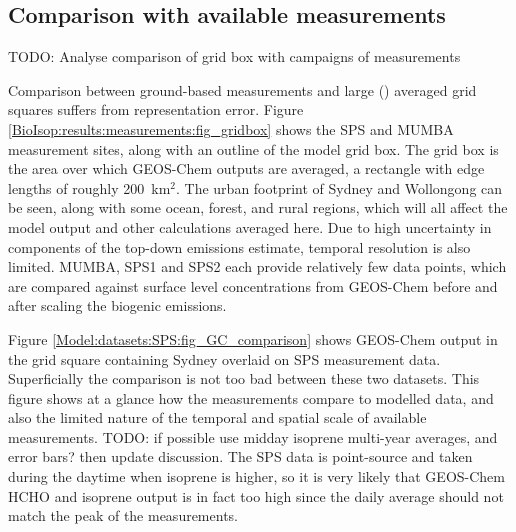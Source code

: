   
  \subsection{Comparison with available measurements}
    \label{BioIsop:results:measurements}
    TODO: %
    Analyse comparison of grid box with campaigns of measurements
    
    Comparison between ground-based measurements and large (\lowhr) averaged grid squares suffers from representation error.
    Figure \ref{BioIsop:results:measurements:fig_gridbox} shows the SPS and MUMBA measurement sites, along with an outline of the \lowhr model grid box.
    The grid box is the area over which GEOS-Chem outputs are averaged, a rectangle with edge lengths of roughly 200~km$^{2}$.
    The urban footprint of Sydney and Wollongong can be seen, along with some ocean, forest, and rural regions, which will all affect the model output and other calculations averaged here.
    Due to high uncertainty in components of the top-down emissions estimate, temporal resolution is also limited.
    MUMBA, SPS1 and SPS2 each provide relatively few data points, which are compared against surface level concentrations from GEOS-Chem before and after scaling the biogenic emissions.
    
    
    Figure \ref{Model:datasets:SPS:fig_GC_comparison} shows GEOS-Chem output in the grid square containing Sydney overlaid on SPS measurement data.
    Superficially the comparison is not too bad between these two datasets.
    This figure shows at a glance how the measurements compare to modelled data, and also the limited nature of the temporal and spatial scale of available measurements.
    TODO: if possible use midday isoprene multi-year averages, and error bars? then update discussion.
    The SPS data is point-source and taken during the daytime when isoprene is higher, so it is very likely that GEOS-Chem HCHO and isoprene output is in fact too high since the daily average should not match the peak of the measurements.
    
    
